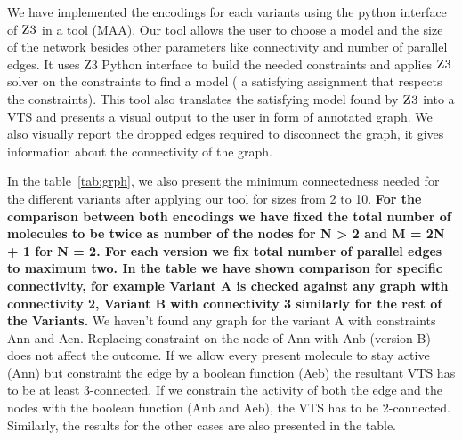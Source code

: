 %

We have implemented the encodings for each variants
using the python interface of $\textsc{Z3}$ in a tool (MAA).
%
Our tool allows the user to choose a model and the size of the network
besides other parameters like connectivity and number of parallel
edges.
%
It uses Z3 Python interface to build the needed constraints and
applies $\textsc{Z3}$ solver on the constraints to find a model (
a satisfying assignment that respects the constraints).
%
This tool also translates the satisfying model found by $\textsc{Z3}$ into
a VTS and presents a visual output to the user in form of annotated graph.
%
%
%
We also visually report the dropped edges required to disconnect the graph, it gives information about the connectivity of the graph.


In the table~\ref{tab:grph}, we also present the minimum connectedness needed for
the different variants after applying our tool for sizes from 2 to 10. \textbf{For the comparison between both encodings we have fixed the total number of molecules to be twice as number of the nodes for N > 2 and M = 2N + 1 for N = 2. For each version we fix total number of parallel edges to maximum two. In the table we have shown comparison for specific connectivity, for example Variant A is checked against any graph with connectivity 2, Variant B with connectivity 3 similarly for the rest of the Variants. }
%
We haven't found any graph for the variant A with constraints Ann and Aen.
%
Replacing constraint on the node of Ann with Anb (version B) does not affect the outcome.
%
If we allow every present molecule to stay active (Ann) but constraint the edge
by a boolean function (Aeb) the resultant VTS has to be at least 3-connected.
%
If we constrain the activity of both the edge and the nodes with the boolean function (Anb and Aeb), 
the VTS has to be 2-connected.
%
Similarly, the results for the other cases are also presented in the table.

